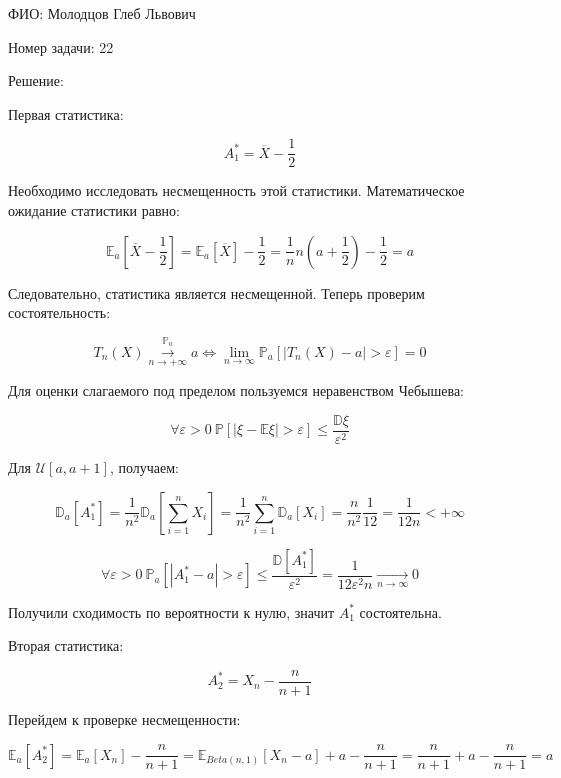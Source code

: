 \documentclass[14pt]{extarticle}
\begin{document}
ФИО: Молодцов Глеб Львович

\vspace{10pt}

Номер задачи: 22

\vspace{10pt}

Решение:

\vspace{10pt}

Первая статистика: 

$$
A_1^* = \overline{X} - \frac{1}{2}
$$

Необходимо исследовать несмещенность этой статистики. Математическое ожидание статистики равно:

$$
\mathbb E_a \left[\overline{X} - \frac{1}{2}\right] = \mathbb E_a \left[\overline{X}\right] - \frac{1}{2} = \frac{1}{n}n\left(a + \frac{1}{2}\right) - \frac{1}{2} = a 
$$

Следовательно, статистика является несмещенной. Теперь проверим состоятельность:

$$
 T_n(X) \overset{\mathbb P_a}{\underset{n\rightarrow+\infty}{\longrightarrow}} a \Leftrightarrow \underset{n\rightarrow\infty}{\lim} \mathbb P_a\left[|T_n(X) - a| > \varepsilon\right] = 0
$$

Для оценки слагаемого под пределом пользуемся неравенством Чебышева:

$$
\forall \varepsilon > 0 ~\mathbb P\left[|\xi - \mathbb E\xi| > \varepsilon\right] \leqslant \frac{\mathbb D\xi}{\varepsilon^2}
$$

Для $\mathcal{U}[a, a+1]$, получаем:

$$
\mathbb D_a[A_1^*] = \frac{1}{n^2}\mathbb D_a\left[\sum\limits_{i=1}^n X_i\right] = \frac{1}{n^2}\sum\limits_{i=1}^n \mathbb D_a[X_i] = \frac{n}{n^2}\frac{1}{12} = \frac{1}{12n} < +\infty
$$

$$
\forall \varepsilon > 0 ~ \mathbb P_a[|A_1^* - a| > \varepsilon] \leqslant \frac{\mathbb D[A_1^*]}{\varepsilon^2} = \frac{1}{12\varepsilon^2n}\underset{n\rightarrow\infty}{\longrightarrow}0
$$

Получили сходимость по вероятности к нулю, значит $A_1^*$ состоятельна.

Вторая статистика: 

$$
A_2^* = X_n - \frac{n}{n+1}
$$

Перейдем к проверке несмещенности:

$$
\mathbb E_a[A_2^*] = \mathbb E_a[X_n] - \frac{n}{n+1} = \mathbb E_{Beta(n, 1)}[X_n - a] + a - \frac{n}{n+1} = \frac{n}{n+1} + a - \frac{n}{n+1} = a
$$
\end{document}
